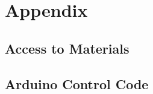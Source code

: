 \section{Appendix}
\subsection{Access to Materials}
\subsection{Arduino Control Code}
\singlespacing
